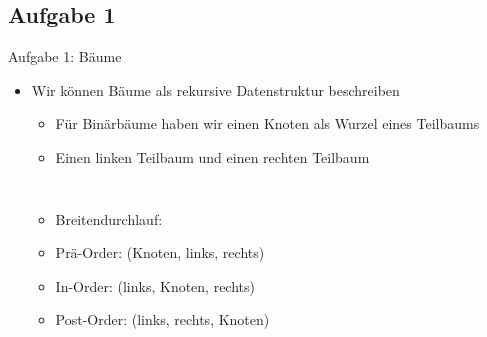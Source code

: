 \subsection{Aufgabe 1}
\begin{frame}{Aufgabe 1: Bäume}
\begin{itemize}[<+(1)->]
    \item Wir können Bäume als rekursive Datenstruktur beschreiben \begin{itemize}
        \item Für Binärbäume haben wir einen Knoten als Wurzel eines Teilbaums
        \item Einen linken Teilbaum und einen rechten Teilbaum
    \end{itemize}\bigskip
\begin{columns}[onlytextwidth,c]
    \begin{itemize}
        \item<6-> Breitendurchlauf:\\
        \item<8-> Prä-Order: (Knoten, links, rechts)\\
        \item<10-> In-Order: (links, Knoten, rechts)\\
        \item<12-> Post-Order: (links, rechts, Knoten)\\
    \end{itemize}
\end{columns}
\end{itemize}
\end{frame}

